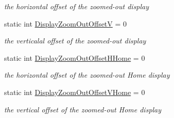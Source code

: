 \begin{DoxyCompactItemize}
\begin{DoxyCompactList}\small\item\em the horizontal offset of the zoomed-\/out display \end{DoxyCompactList}\item 
\mbox{\label{class_t_display_a3c63a18e8901299ab56176c034072b1c}} 
static int \mbox{\hyperlink{class_t_display_a3c63a18e8901299ab56176c034072b1c}{Display\+Zoom\+Out\+OffsetV}} = 0
\begin{DoxyCompactList}\small\item\em the verticalal offset of the zoomed-\/out display \end{DoxyCompactList}\item 
\mbox{\label{class_t_display_a62c3d449d00b1a063a4bf7f212968e87}} 
static int \mbox{\hyperlink{class_t_display_a62c3d449d00b1a063a4bf7f212968e87}{Display\+Zoom\+Out\+Offset\+H\+Home}} = 0
\begin{DoxyCompactList}\small\item\em the horizontal offset of the zoomed-\/out \textquotesingle{}Home\textquotesingle{} display \end{DoxyCompactList}\item 
\mbox{\label{class_t_display_a758f553cef2eb9b3eee4d491454a7da9}} 
static int \mbox{\hyperlink{class_t_display_a758f553cef2eb9b3eee4d491454a7da9}{Display\+Zoom\+Out\+Offset\+V\+Home}} = 0
\begin{DoxyCompactList}\small\item\em the vertical offset of the zoomed-\/out \textquotesingle{}Home\textquotesingle{} display \end{DoxyCompactList}\end{DoxyCompactItemize}
